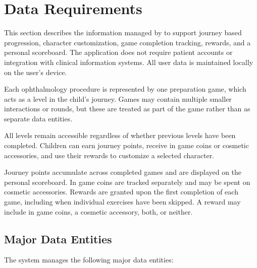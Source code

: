 \documentclass[12pt]{article}
\begin{document}
\section{Data Requirements}
\label{sec_Data_Requirements}

This section describes the information managed by \progname{}
to support journey based progression, character customization,
game completion tracking, rewards, and a personal scoreboard.
The application does not require patient accounts or
integration with clinical information systems. All user
data is maintained locally on the user's device.

Each ophthalmology procedure is represented by one
preparation game, which acts as a level in the child's
journey. Games may contain multiple smaller interactions
or rounds, but these are treated as part of the game
rather than as separate data entities.

All levels remain accessible regardless of whether previous
levels have been completed. Children can earn journey points,
receive in game coins or cosmetic accessories, and use
their rewards to customize a selected character.

Journey points accumulate across completed games and are
displayed on the personal scoreboard. In game coins are
tracked separately and may be spent on cosmetic accessories.
Rewards are granted upon the first completion of each game,
including when individual exercises have been skipped. A reward
may include in game coins, a cosmetic accessory, both, or neither.


\subsection{Major Data Entities}

The system manages the following major data entities:
\end{document}
